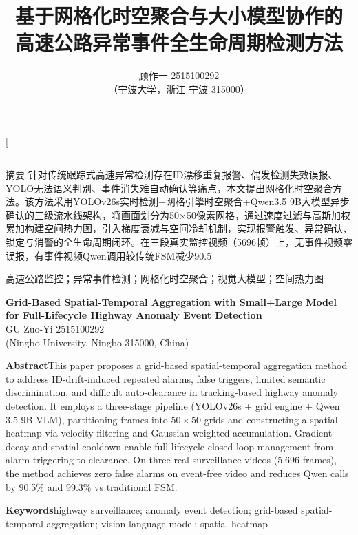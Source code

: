 \documentclass[10.5pt,a4paper,twoside,twocolumn]{ctexart}
\title{\heiti\zihao{2} 基于网格化时空聚合与大小模型协作的\\高速公路异常事件全生命周期检测方法}
\author{\fangsong\zihao{3} 顾作一 2515100292\\\zihao{6}（宁波大学，浙江 宁波 315000）}
\date{}
\begin{document}
\twocolumn[
\maketitle

\vspace{-6mm}
\noindent\rule{\textwidth}{0.4pt}

\vspace{2mm}
{\heiti{} 摘\quad 要}\quad
{}
针对传统跟踪式高速异常检测存在ID漂移重复报警、偶发检测失效误报、YOLO无法语义判别、事件消失难自动确认等痛点，本文提出网格化时空聚合方法。该方法采用YOLOv26s实时检测+网格引擎时空聚合+Qwen3.5 9B大模型异步确认的三级流水线架构，将画面划分为50×50像素网格，通过速度过滤与高斯加权累加构建空间热力图，引入梯度衰减与空间冷却机制，实现报警触发、异常确认、锁定与消警的全生命周期闭环。在三段真实监控视频（5696帧）上，无事件视频零误报，有事件视频Qwen调用较传统FSM减少90.5%

\vspace{3mm}
\quad {} 高速公路监控；异常事件检测；网格化时空聚合；视觉大模型；空间热力图


\vspace{3mm}
\begin{center}
\textbf{Grid-Based Spatial-Temporal Aggregation with Small+Large Model for Full-Lifecycle Highway Anomaly Event Detection}\\
\vspace{2mm}
 GU Zuo-Yi 2515100292\\
 (Ningbo University, Ningbo 315000, China)
\end{center}

\noindent\textbf{Abstract}\quad This paper proposes a grid-based spatial-temporal aggregation method to address ID-drift-induced repeated alarms, false triggers, limited semantic discrimination, and difficult auto-clearance in tracking-based highway anomaly detection. It employs a three-stage pipeline (YOLOv26s + grid engine + Qwen 3.5-9B VLM), partitioning frames into $50\times50$ grids and constructing a spatial heatmap via velocity filtering and Gaussian-weighted accumulation. Gradient decay and spatial cooldown enable full-lifecycle closed-loop management from alarm triggering to clearance. On three real surveillance videos (5,696 frames), the method achieves zero false alarms on event-free video and reduces Qwen calls by 90.5\% and 99.3\% vs traditional FSM.

\vspace{3mm}
\noindent\textbf{Keywords}\quad highway surveillance; anomaly event detection; grid-based spatial-temporal aggregation; vision-language model; spatial heatmap
\end{document}
